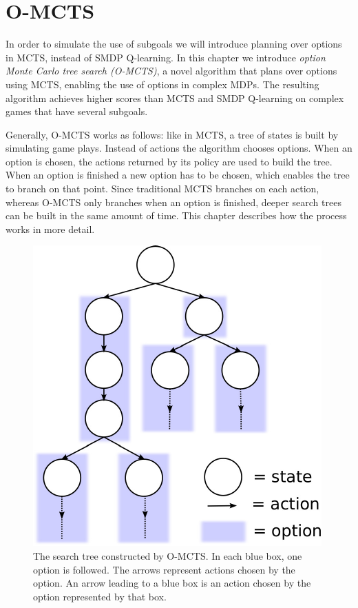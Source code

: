 \section{O-MCTS}
\label{sec:planning}

In order to simulate the use of subgoals we will introduce planning over
options in MCTS, instead of SMDP Q-learning. In this chapter we introduce
\emph{option Monte Carlo tree search (O-MCTS)}, a novel algorithm that plans
over options using MCTS, enabling the use of options in complex MDPs. The
resulting algorithm achieves higher scores than MCTS and SMDP Q-learning on
complex games that have several subgoals.

Generally, O-MCTS works as follows: like in MCTS, a tree of states is
built by simulating game plays. Instead of actions the algorithm chooses
options. When an option is chosen, the actions returned by its policy are used
to build the tree. When an option is finished a new option has to be chosen,
which enables the tree to branch on that point. Since traditional MCTS branches
on each action, whereas O-MCTS only branches when an option is finished, deeper
search trees can be built in the same amount of time. This chapter describes
how the process works in more detail.


\begin{figure}
	\centering
	\includegraphics[width=.5\columnwidth]{includes/omcts-eps-converted-to.pdf}
	\caption{The search tree constructed by O-MCTS\@. In each blue box, one
	option is followed. The arrows represent actions chosen by the option. An
	arrow leading to a blue box is an action chosen by the option represented by
	that box.}
\label{fig:omcts-tree}
\end{figure}

